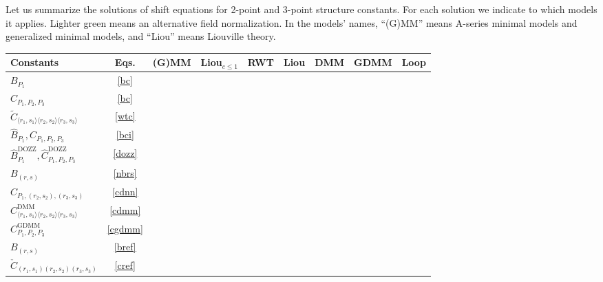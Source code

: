 \documentclass[12pt, a4paper]{article}
\begin{document}
Let us summarize the solutions of shift equations for 2-point and 3-point structure constants. For each solution we indicate to which models it applies. Lighter green means an alternative field normalization. In the models' names, ``(G)MM'' means A-series minimal models and generalized minimal models, and ``Liou'' means Liouville theory. 
\begin{center}
\begin{tabular}{|l|c|c|c|c|c|c|c|c|}
\hline 
 Constants & Eqs. & (G)MM & Liou$_{c\leq 1}$ & RWT & Liou & DMM & GDMM & Loop 
 \\
 \hline
  $B_{P_1}$ & \eqref{bc} & \cellcolor{green!80!black} & \cellcolor{green!80!black} & \cellcolor{green!80!black} &  & \cellcolor{green!80!black} & \cellcolor{green!80!black} & \cellcolor{green!80!black}
  \\
  \hline 
  $C_{P_1,P_2,P_3}$& \eqref{bc} & \cellcolor{green!80!black} & \cellcolor{green!80!black} & \cellcolor{green!80!black} &  &  &  & \cellcolor{green!80!black}
  \\
  \hline 
  $\widetilde{C}_{\langle r_1,s_1\rangle\langle r_2,s_2\rangle\langle r_3,s_3\rangle}$ & \eqref{wtc} & \cellcolor{green!60} & & & & & &
  \\
  \hline 
  $\hat{B}_{P_1},\hat{C}_{P_1,P_2,P_3}$ &  \eqref{bci} & & & & \cellcolor{green!80!black} & & &
  \\
  \hline 
  $\hat{B}^\text{DOZZ}_{P_1},\hat{C}^\text{DOZZ}_{P_1,P_2,P_3}$ & \eqref{dozz} & & & & \cellcolor{green!60} & & &
  \\
  \hline 
  $B_{(r,s)}$ & \eqref{nbrs} & & & & & \cellcolor{green!80!black} & \cellcolor{green!80!black} &
  \\
  \hline 
  $C_{P_1,(r_2,s_2),(r_3,s_3)}$ & \eqref{cdnn} & & & & & \cellcolor{green!80!black} & \cellcolor{green!80!black} &
  \\
  \hline 
  $C^\text{DMM}_{\langle r_1,s_1\rangle\langle r_2,s_2\rangle\langle r_3,s_3\rangle}$ & \eqref{cdmm} &
  & & & & \cellcolor{green!80!black} & &
  \\
  \hline 
  $C^\text{GDMM}_{P_1,P_2,P_3}$ & \eqref{cgdmm} &
  & & & & & \cellcolor{green!80!black} &
  \\
  \hline 
  $B_{(r,s)}$ & \eqref{bref} & & & & & & & \cellcolor{green!80!black}
  \\
  \hline 
  $\check{C}_{(r_1,s_1)(r_2,s_2)(r_3,s_3)}$ & \eqref{cref} & & & & & & & \cellcolor{green!80!black}
  \\
  \hline 
\end{tabular}
\end{center}
\end{document}
